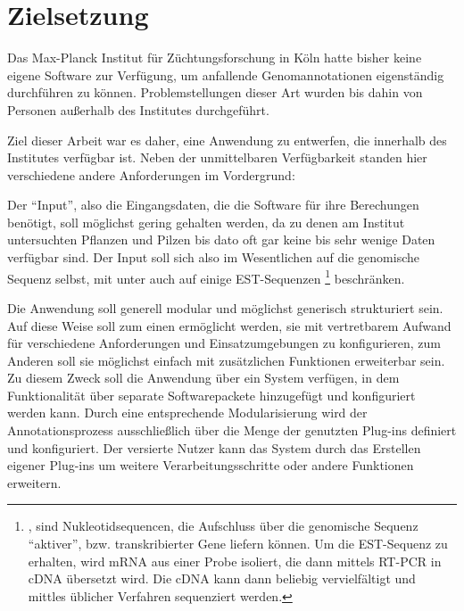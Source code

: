 
\chapter{Zielsetzung}\label{chp:zielsetzung}
Das Max-Planck Institut für Züchtungsforschung in Köln hatte bisher keine
eigene Software zur Verfügung, um anfallende Genomannotationen eigenständig
durchführen zu können. Problemstellungen dieser Art wurden bis dahin von
Personen außerhalb des Institutes durchgeführt.

Ziel dieser Arbeit war es daher, eine Anwendung zu entwerfen, die
innerhalb des Institutes verfügbar ist. Neben der unmittelbaren Verfügbarkeit
standen hier verschiedene andere Anforderungen im Vordergrund:

Der \enquote{Input}, also die Eingangsdaten, die die Software für ihre
Berechungen benötigt, soll möglichst gering gehalten werden, da zu denen am
Institut untersuchten Pflanzen und Pilzen bis dato oft gar keine bis sehr wenige
Daten verfügbar sind.
Der Input soll sich also im Wesentlichen auf die genomische Sequenz selbst, mit
unter auch auf einige EST-Sequenzen
\footnote{,  sind
Nukleotidsequencen, die Aufschluss über die genomische Sequenz
\enquote{aktiver}, bzw. transkribierter Gene liefern können.
Um die EST-Sequenz zu erhalten, wird mRNA  aus einer Probe
isoliert, die dann mittels RT-PCR  in cDNA
 übersetzt wird.
Die cDNA kann dann beliebig vervielfältigt und
mittles üblicher Verfahren sequenziert werden. }
beschränken.

Die Anwendung soll generell modular und möglichst generisch strukturiert sein.
Auf diese Weise soll zum einen ermöglicht werden, sie mit vertretbarem
Aufwand für verschiedene Anforderungen und Einsatzumgebungen zu konfigurieren,
zum Anderen soll sie möglichst einfach mit zusätzlichen Funktionen
erweiterbar sein.
Zu diesem Zweck soll die Anwendung über ein  System verfügen, in
dem Funktionalität über separate Softwarepackete hinzugefügt und konfiguriert
werden kann.
Durch eine entsprechende  Modularisierung wird der Annotationsprozess
ausschließlich über die Menge der genutzten Plug-ins definiert und
konfiguriert.
Der versierte Nutzer kann das System durch das Erstellen eigener Plug-ins um
weitere Verarbeitungsschritte oder andere Funktionen erweitern.

